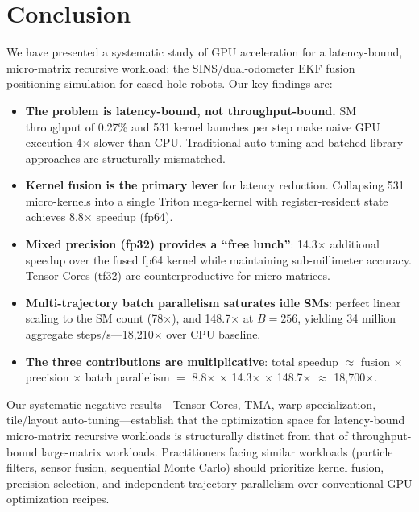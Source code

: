 \documentclass[pdflatex,sn-mathphys-num]{sn-jnl}%
\theoremstyle{thmstyleone}%
\theoremstyle{thmstyletwo}%
\theoremstyle{thmstylethree}%
\begin{document}
\section{Conclusion}\label{sec6}

We have presented a systematic study of GPU acceleration for a latency-bound, micro-matrix recursive workload: the SINS/dual-odometer EKF fusion positioning simulation for cased-hole robots. Our key findings are:

\begin{itemize}
\item \textbf{The problem is latency-bound, not throughput-bound.} SM throughput of 0.27\% and 531 kernel launches per step make naive GPU execution 4$\times$ slower than CPU. Traditional auto-tuning and batched library approaches are structurally mismatched.

\item \textbf{Kernel fusion is the primary lever} for latency reduction. Collapsing 531 micro-kernels into a single Triton mega-kernel with register-resident state achieves 8.8$\times$ speedup (fp64).

\item \textbf{Mixed precision (fp32) provides a ``free lunch''}: 14.3$\times$ additional speedup over the fused fp64 kernel while maintaining sub-millimeter accuracy. Tensor Cores (tf32) are counterproductive for micro-matrices.

\item \textbf{Multi-trajectory batch parallelism saturates idle SMs}: perfect linear scaling to the SM count (78$\times$), and 148.7$\times$ at $B=256$, yielding 34 million aggregate steps/s---18,210$\times$ over CPU baseline.

\item \textbf{The three contributions are multiplicative}: total speedup $\approx$ fusion $\times$ precision $\times$ batch parallelism $=$ 8.8$\times$ $\times$ 14.3$\times$ $\times$ 148.7$\times$ $\approx$ 18,700$\times$.
\end{itemize}

Our systematic negative results---Tensor Cores, TMA, warp specialization, tile/layout auto-tuning---establish that the optimization space for latency-bound micro-matrix recursive workloads is structurally distinct from that of throughput-bound large-matrix workloads. Practitioners facing similar workloads (particle filters, sensor fusion, sequential Monte Carlo) should prioritize kernel fusion, precision selection, and independent-trajectory parallelism over conventional GPU optimization recipes.
\end{document}
